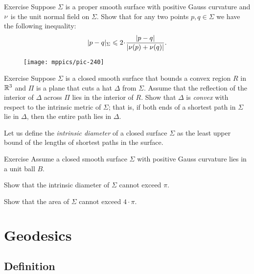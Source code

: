 \begin{thm}{Exercise}\label{ex:length-dist-conv}
Suppose $\Sigma$ is a proper smooth surface with positive Gauss curvature and $\nu$ is the unit normal field on $\Sigma$.
Show that for any two points $p,q\in \Sigma$ we have the following inequality:
\[|p-q|_\Sigma\le 2\cdot \frac{|p-q|}{|\Norm(p)+\Norm(q)|}.\]

\end{thm}


\begin{wrapfigure}{r}{27 mm}
\vskip-10mm
\centering
\texttt{[image: mppics/pic-240]}
\end{wrapfigure}

\begin{thm}{Exercise}\label{ex:hat-convex}
Suppose $\Sigma$ is a closed smooth surface that bounds a convex region $R$ 
in $\mathbb{R}^3$
and $\Pi$ is a plane that cuts a hat $\Delta$ from $\Sigma$.
Assume that the reflection of the interior of $\Delta$ across $\Pi$ lies in the interior of $R$.
Show that $\Delta$ is \emph{convex} with respect to the intrinsic metric  of $\Sigma$;
that is, 
if both ends of a shortest path in $\Sigma$ 
lie in $\Delta$,
then the entire path lies in $\Delta$.
\end{thm}


Let us define the \emph{intrinsic diameter} of a closed surface $\Sigma$ as the least upper bound of the lengths of shortest paths in the surface.

\begin{thm}{Exercise}\label{ex:intrinsic-diameter}
Assume a closed smooth surface $\Sigma$ with positive Gauss curvature lies in a unit ball $B$.

\begin{subthm}{} Show that the intrinsic diameter of $\Sigma$ cannot exceed $\pi$.
 
\end{subthm}

\begin{subthm}{}
Show that the area of $\Sigma$ cannot exceed $4\cdot \pi$.
\end{subthm}

\end{thm}

\chapter{Geodesics}


\section{Definition}

